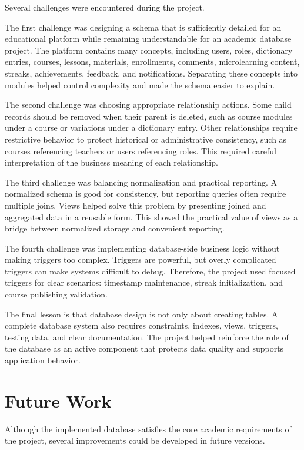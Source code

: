 Several challenges were encountered during the project.

The first challenge was designing a schema that is sufficiently detailed for an educational platform while remaining understandable for an academic database project. The platform contains many concepts, including users, roles, dictionary entries, courses, lessons, materials, enrollments, comments, microlearning content, streaks, achievements, feedback, and notifications. Separating these concepts into modules helped control complexity and made the schema easier to explain.

The second challenge was choosing appropriate relationship actions. Some child records should be removed when their parent is deleted, such as course modules under a course or variations under a dictionary entry. Other relationships require restrictive behavior to protect historical or administrative consistency, such as courses referencing teachers or users referencing roles. This required careful interpretation of the business meaning of each relationship.

The third challenge was balancing normalization and practical reporting. A normalized schema is good for consistency, but reporting queries often require multiple joins. Views helped solve this problem by presenting joined and aggregated data in a reusable form. This showed the practical value of views as a bridge between normalized storage and convenient reporting.

The fourth challenge was implementing database-side business logic without making triggers too complex. Triggers are powerful, but overly complicated triggers can make systems difficult to debug. Therefore, the project used focused triggers for clear scenarios: timestamp maintenance, streak initialization, and course publishing validation.

The final lesson is that database design is not only about creating tables. A complete database system also requires constraints, indexes, views, triggers, testing data, and clear documentation. The project helped reinforce the role of the database as an active component that protects data quality and supports application behavior.

\section{Future Work}

Although the implemented database satisfies the core academic requirements of the project, several improvements could be developed in future versions.

